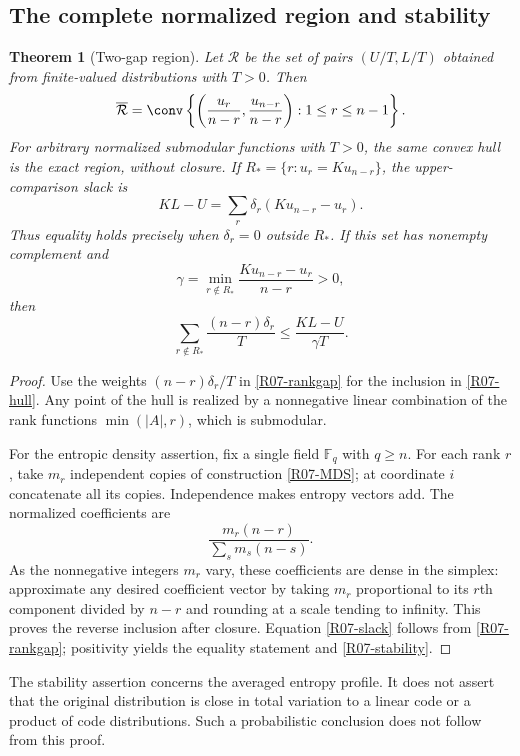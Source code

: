 \documentclass[11pt,a4paper]{article}
\newtheorem{theorem}{Theorem}[section]
\theoremstyle{definition}\newtheorem{definition}[theorem]{Definition}
\theoremstyle{remark}\newtheorem{remark}[theorem]{Remark}
\numberwithin{equation}{section}
\begin{document}
\subsection{The complete normalized region and stability}\label{R07-sec-3}
\begin{theorem}[Two-gap region]\label{R07-region}
Let $\mathcal R$ be the set of pairs $(U/T,L/T)$ obtained from finite-valued distributions with $T>0$. Then
\begin{equation}\label{R07-hull}
 \overline{\mathcal R}
 =\conv\left\{\left(\frac{u_r}{n-r},\frac{u_{n-r}}{n-r}\right):1\le r\le n-1\right\}.
\end{equation}
For arbitrary normalized submodular functions with $T>0$, the same convex hull is the exact region, without closure. If $R_* =\{r:u_r=K u_{n-r}\}$, the upper-comparison slack is
\begin{equation}\label{R07-slack}
 KL-U=\sum_r\delta_r(Ku_{n-r}-u_r).
\end{equation}
Thus equality holds precisely when $\delta_r=0$ outside $R_*$. If this set has nonempty complement and
\[
 \gamma=\min_{r\notin R_*}\frac{Ku_{n-r}-u_r}{n-r}>0,
\]
then
\begin{equation}\label{R07-stability}
 \sum_{r\notin R_*}\frac{(n-r)\delta_r}{T}
 \le\frac{KL-U}{\gamma T}.
\end{equation}
\end{theorem}
\begin{proof}
Use the weights $(n-r)\delta_r/T$ in \eqref{R07-rankgap} for the inclusion in \eqref{R07-hull}. Any point of the hull is realized by a nonnegative linear combination of the rank functions $\min(|A|,r)$, which is submodular.

For the entropic density assertion, fix a single field $\mathbb F_q$ with $q\ge n$. For each rank $r$, take $m_r$ independent copies of construction \eqref{R07-MDS}; at coordinate $i$ concatenate all its copies. Independence makes entropy vectors add. The normalized coefficients are
\[
 \frac{m_r(n-r)}{\sum_s m_s(n-s)}.
\]
As the nonnegative integers $m_r$ vary, these coefficients are dense in the simplex: approximate any desired coefficient vector by taking $m_r$ proportional to its $r$th component divided by $n-r$ and rounding at a scale tending to infinity. This proves the reverse inclusion after closure. Equation \eqref{R07-slack} follows from \eqref{R07-rankgap}; positivity yields the equality statement and \eqref{R07-stability}.
\end{proof}

The stability assertion concerns the averaged entropy profile. It does not assert that the original distribution is close in total variation to a linear code or a product of code distributions. Such a probabilistic conclusion does not follow from this proof.
\end{document}
